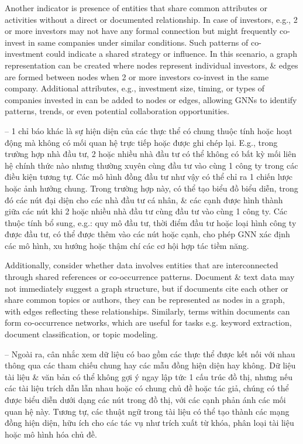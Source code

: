 \documentclass{article}
\begin{document}
\begin{itemize}
\begin{itemize}
\begin{itemize}
            Another indicator is presence of entities that share common attributes or activities without a direct or documented relationship. In case of investors, e.g., 2 or more investors may not have any formal connection but might frequently co-invest in same companies under similar conditions. Such patterns of co-investment could indicate a shared strategy or influence. In this scenario, a graph representation can be created where nodes represent individual investors, \& edges are formed between nodes when 2 or more investors co-invest in the same company. Additional attributes, e.g., investment size, timing, or types of companies invested in can be added to nodes or edges, allowing GNNs to identify patterns, trends, or even potential collaboration opportunities.

            -- 1 chỉ báo khác là sự hiện diện của các thực thể có chung thuộc tính hoặc hoạt động mà không có mối quan hệ trực tiếp hoặc được ghi chép lại. E.g., trong trường hợp nhà đầu tư, 2 hoặc nhiều nhà đầu tư có thể không có bất kỳ mối liên hệ chính thức nào nhưng thường xuyên cùng đầu tư vào cùng 1 công ty trong các điều kiện tương tự. Các mô hình đồng đầu tư như vậy có thể chỉ ra 1 chiến lược hoặc ảnh hưởng chung. Trong trường hợp này, có thể tạo biểu đồ biểu diễn, trong đó các nút đại diện cho các nhà đầu tư cá nhân, \& các cạnh được hình thành giữa các nút khi 2 hoặc nhiều nhà đầu tư cùng đầu tư vào cùng 1 công ty. Các thuộc tính bổ sung, e.g.: quy mô đầu tư, thời điểm đầu tư hoặc loại hình công ty được đầu tư, có thể được thêm vào các nút hoặc cạnh, cho phép GNN xác định các mô hình, xu hướng hoặc thậm chí các cơ hội hợp tác tiềm năng.

            Additionally, consider whether data involves entities that are interconnected through shared references or co-occurrence patterns. Document \& text data may not immediately suggest a graph structure, but if documents cite each other or share common topics or authors, they can be represented as nodes in a graph, with edges reflecting these relationships. Similarly, terms within documents can form co-occurrence networks, which are useful for tasks e.g. keyword extraction, document classification, or topic modeling.

            -- Ngoài ra, cân nhắc xem dữ liệu có bao gồm các thực thể được kết nối với nhau thông qua các tham chiếu chung hay các mẫu đồng hiện diện hay không. Dữ liệu tài liệu \& văn bản có thể không gợi ý ngay lập tức 1 cấu trúc đồ thị, nhưng nếu các tài liệu trích dẫn lẫn nhau hoặc có chung chủ đề hoặc tác giả, chúng có thể được biểu diễn dưới dạng các nút trong đồ thị, với các cạnh phản ánh các mối quan hệ này. Tương tự, các thuật ngữ trong tài liệu có thể tạo thành các mạng đồng hiện diện, hữu ích cho các tác vụ như trích xuất từ khóa, phân loại tài liệu hoặc mô hình hóa chủ đề.


\end{itemize}
\end{itemize}
\end{itemize}
\end{document}
